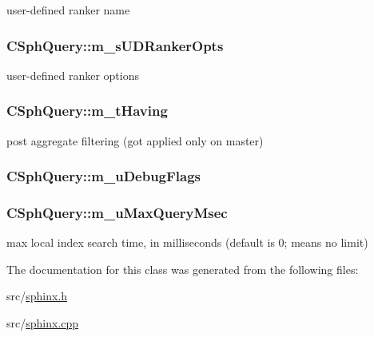 user-\/defined ranker name 

\hypertarget{classCSphQuery_a1a8713b8e60edf27647a37890c4637ff}{
\subsubsection[{m\-\_\-s\-U\-D\-Ranker\-Opts}]{ C\-Sph\-Query\-::m\-\_\-s\-U\-D\-Ranker\-Opts}}\label{classCSphQuery_a1a8713b8e60edf27647a37890c4637ff}


user-\/defined ranker options 

\hypertarget{classCSphQuery_ad2f3489882b02218dd9924fe21ad767b}{
\subsubsection[{m\-\_\-t\-Having}]{ C\-Sph\-Query\-::m\-\_\-t\-Having}}\label{classCSphQuery_ad2f3489882b02218dd9924fe21ad767b}


post aggregate filtering (got applied only on master) 

\hypertarget{classCSphQuery_aacb54cc52df6df9cc9201f375915638b}{
\subsubsection[{m\-\_\-u\-Debug\-Flags}]{ C\-Sph\-Query\-::m\-\_\-u\-Debug\-Flags}}\label{classCSphQuery_aacb54cc52df6df9cc9201f375915638b}
\hypertarget{classCSphQuery_a2b9c353ae3e5ad81b62c6de63918260b}{
\subsubsection[{m\-\_\-u\-Max\-Query\-Msec}]{ C\-Sph\-Query\-::m\-\_\-u\-Max\-Query\-Msec}}\label{classCSphQuery_a2b9c353ae3e5ad81b62c6de63918260b}


max local index search time, in milliseconds (default is 0; means no limit) 



The documentation for this class was generated from the following files\-:\begin{DoxyCompactItemize}
\item 
src/\hyperlink{sphinx_8h}{sphinx.\-h}\item 
src/\hyperlink{sphinx_8cpp}{sphinx.\-cpp}\end{DoxyCompactItemize}
